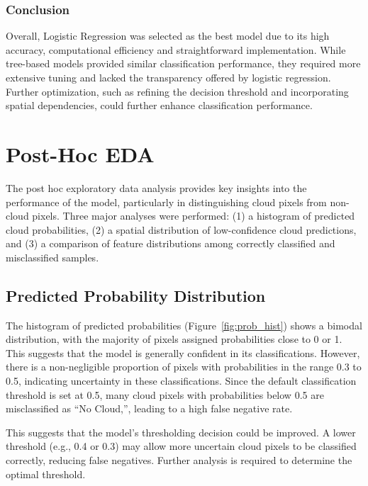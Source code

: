 \documentclass[11pt,letterpaper]{article}
\begin{document}
\vspace{1em} %
\subsubsection{Conclusion}
\vspace{0.5em} %

Overall, Logistic Regression was selected as the best model due to its high accuracy, computational efficiency and straightforward implementation. While tree-based models provided similar classification performance, they required more extensive tuning and lacked the transparency offered by logistic regression. Further optimization, such as refining the decision threshold and incorporating spatial dependencies, could further enhance classification performance.

\newpage
\section{Post-Hoc EDA}

The post hoc exploratory data analysis provides key insights into the performance of the model, particularly in distinguishing cloud pixels from non-cloud pixels. Three major analyses were performed: (1) a histogram of predicted cloud probabilities, (2) a spatial distribution of low-confidence cloud predictions, and (3) a comparison of feature distributions among correctly classified and misclassified samples.

\vspace{1em} %
\subsection{Predicted Probability Distribution}
\vspace{0.5em} %

The histogram of predicted probabilities (Figure~\ref{fig:prob_hist}) shows a bimodal distribution, with the majority of pixels assigned probabilities close to 0 or 1. This suggests that the model is generally confident in its classifications. However, there is a non-negligible proportion of pixels with probabilities in the range 0.3 to 0.5, indicating uncertainty in these classifications. Since the default classification threshold is set at 0.5, many cloud pixels with probabilities below 0.5 are misclassified as ``No Cloud,'', leading to a high false negative rate.

This suggests that the model’s thresholding decision could be improved. A lower threshold (e.g., 0.4 or 0.3) may allow more uncertain cloud pixels to be classified correctly, reducing false negatives. Further analysis is required to determine the optimal threshold.
\end{document}
